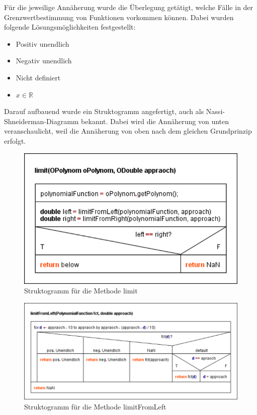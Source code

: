 Für die jeweilige Annäherung wurde die Überlegung getätigt, welche Fälle in der Grenzwertbestimmung von Funktionen vorkommen können. Dabei wurden folgende Lösungsmöglichkeiten festgestellt:
\begin{itemize}
	\item Positiv unendlich
	\item Negativ unendlich
	\item Nicht definiert	
	\item $ x \in \mathbb{R}$
\end{itemize}
	

Darauf aufbauend wurde ein Struktogramm angefertigt, auch als Nassi-Shneiderman-Diagramm bekannt. Dabei wird die Annäherung von unten veranschaulicht, weil die Annäherung von oben nach dem gleichen Grundprinzip erfolgt. 

\begin{figure}[!h]
	\includegraphics[scale=1]{img/struktogramm-limit}
	\caption[Struktogramm für die Methode limit]{Struktogramm für die Methode limit\footnotemark}
\end{figure}
\FloatBarrier


\begin{figure}[!h]
	\includegraphics[scale=1]{img/struktogramm-limitFromLeft}
	\caption[Struktogramm für die Methode limitFromLeft]{Struktogramm für die Methode limitFromLeft\footnotemark}
\end{figure}
\FloatBarrier

